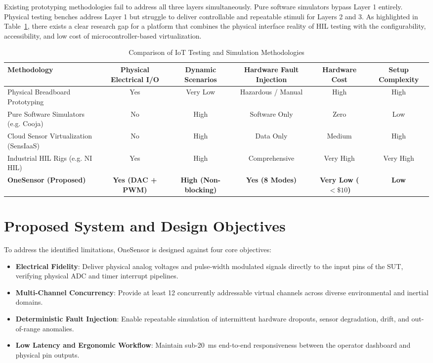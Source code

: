 \documentclass[conference]{IEEEtran}
\begin{document}
Existing prototyping methodologies fail to address all three layers simultaneously. Pure software simulators bypass Layer 1 entirely. Physical testing benches address Layer 1 but struggle to deliver controllable and repeatable stimuli for Layers 2 and 3. As highlighted in Table~\ref{tab:comparison}, there exists a clear research gap for a platform that combines the physical interface reality of HIL testing with the configurability, accessibility, and low cost of microcontroller-based virtualization.

\begin{table}[t]
\caption{Comparison of IoT Testing and Simulation Methodologies}
\label{tab:comparison}
\centering
\begin{tabular}{lccccc}
\toprule
\textbf{Methodology} & \textbf{Physical Electrical I/O} & \textbf{Dynamic Scenarios} & \textbf{Hardware Fault Injection} & \textbf{Hardware Cost} & \textbf{Setup Complexity} \\
\midrule
Physical Breadboard Prototyping & Yes & Very Low & Hazardous / Manual & High & High \\
Pure Software Simulators (e.g. Cooja) & No & High & Software Only & Zero & Low \\
Cloud Sensor Virtualization (SensIaaS) & No & High & Data Only & Medium & High \\
Industrial HIL Rigs (e.g. NI HIL) & Yes & High & Comprehensive & Very High & Very High \\
\textbf{OneSensor (Proposed)} & \textbf{Yes (DAC + PWM)} & \textbf{High (Non-blocking)} & \textbf{Yes (8 Modes)} & \textbf{Very Low ($<\$10$)} & \textbf{Low} \\
\bottomrule
\end{tabular}
\end{table}

\section{Proposed System and Design Objectives}
To address the identified limitations, OneSensor is designed against four core objectives:
\begin{itemize}
    \item \textbf{Electrical Fidelity}: Deliver physical analog voltages and pulse-width modulated signals directly to the input pins of the SUT, verifying physical ADC and timer interrupt pipelines.
    \item \textbf{Multi-Channel Concurrency}: Provide at least 12 concurrently addressable virtual channels across diverse environmental and inertial domains.
    \item \textbf{Deterministic Fault Injection}: Enable repeatable simulation of intermittent hardware dropouts, sensor degradation, drift, and out-of-range anomalies.
    \item \textbf{Low Latency and Ergonomic Workflow}: Maintain sub-20~ms end-to-end responsiveness between the operator dashboard and physical pin outputs.
\end{itemize}
\end{document}
